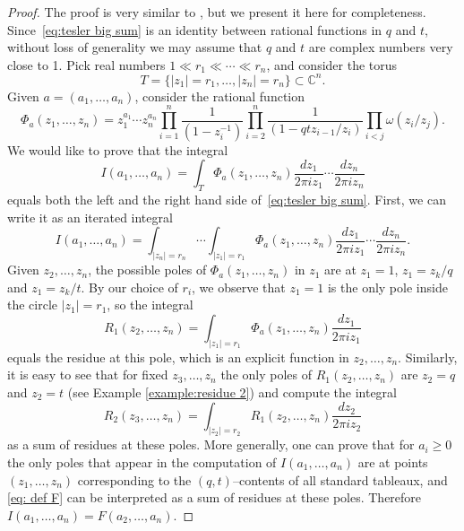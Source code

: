 \documentclass[11pt,reqno]{amsart}
\theoremstyle{definition}
\numberwithin{equation}{section}
\begin{document}
\begin{proof}
The proof is very similar to \cite[Section 6.5]{GN.2015}, but we present it here for completeness. 
Since~\eqref{eq:tesler big sum} is an identity between rational functions in $q$ and $t$, without loss of generality 
we may assume that $q$ and $t$ are complex numbers very close to 1. Pick real numbers $1\ll r_1\ll \cdots \ll r_n$, 
and consider the torus
\[
	T=\{|z_1|=r_1,\ldots,|z_n|=r_n\}\subset \mathbb{C}^n.
\]
Given $a=(a_1,\ldots,a_n)$, consider the rational function 
\[
	\Phi_a(z_1,\ldots,z_n)=z_1^{a_1}\cdots z_n^{a_n}
	\prod_{i=1}^{n}\frac{1}{(1-z_i^{-1})}\prod_{i=2}^{n}\frac{1}{(1-qtz_{i-1}/z_i)}
	\prod_{i<j}\omega(z_i/z_j).
\]
We would like to prove that the integral 
\[
	I(a_1,\ldots,a_n)=\int_T \Phi_a(z_1,\ldots,z_n) \frac{dz_1}{2\pi iz_1}\cdots \frac{dz_n}{2\pi iz_n}
\]
equals both the left and the right hand side of~\eqref{eq:tesler big sum}.
First, we can write it as an iterated integral
\[
	I(a_1,\ldots,a_n)=\int_{|z_n|=r_n}\cdots \int_{|z_1|=r_1} 
	\Phi_a(z_1,\ldots,z_n) \frac{dz_1}{2\pi iz_1}\cdots \frac{dz_n}{2\pi iz_n}.
\]
Given $z_2,\ldots,z_n$, the possible poles of $\Phi_a(z_1,\ldots,z_n)$ in $z_1$ are at $z_1=1$, $z_1=z_k/q$ and 
$z_1=z_k/t$. By our choice of $r_i$, we observe that $z_1=1$ is the only pole inside the circle $|z_1|=r_1$, so the integral
\[
	R_1(z_2,\ldots,z_n)=\int_{|z_1|=r_1} \Phi_a(z_1,\ldots,z_n) \frac{dz_1}{2\pi iz_1}
\]
equals the residue at this pole, which is an explicit function in $z_2,\ldots,z_n$. Similarly, it is easy to see that for fixed 
$z_3,\ldots,z_n$ the only poles of $R_1(z_2,\ldots,z_n)$ are $z_2=q$ and $z_2=t$ (see Example \ref{example:residue 2}) 
and compute the integral
\[
	R_2(z_3,\ldots,z_n)=\int_{|z_2|=r_2}R_1(z_2,\ldots,z_n)\frac{dz_2}{2\pi iz_2}
\]
as a sum of residues at these poles. More generally, one can prove that for $a_i\geqslant 0$ the only poles that appear 
in the computation of $I(a_1,\ldots,a_n)$ are at points $(z_1,\ldots,z_n)$ corresponding 
to the $(q,t)$--contents of all standard tableaux, and \eqref{eq: def F} can be interpreted as a sum of residues 
at these poles. Therefore $I(a_1,\ldots,a_n)=F(a_2,\ldots,a_n)$.


\end{proof}
\end{document}
